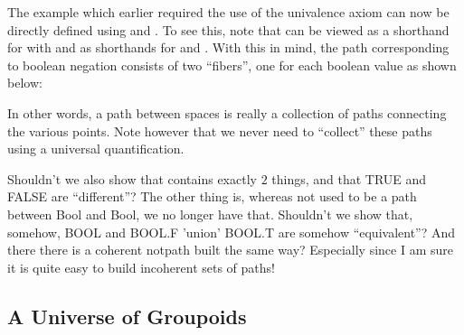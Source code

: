 The example  which earlier required the use of the
univalence axiom can now be directly defined using
 and . To
see this, note that  can be viewed as a shorthand for
 
 with  and
 as shorthands for
  and
 . With this in
mind, the path corresponding to boolean negation consists of two ``fibers'',
one for each boolean value as shown below:

\noindent In other words, a path between spaces is really a collection of
paths connecting the various points. Note however that we never need to
``collect'' these paths using a universal quantification.

Shouldn't we also show that  contains exactly
$2$ things, and that TRUE and FALSE are ``different''? The other thing
is, whereas not used to be a path between Bool and Bool, we no longer
have that.  Shouldn't we show that, somehow, BOOL and BOOL.F 'union'
BOOL.T are somehow ``equivalent''?  And there there is a coherent
notpath built the same way?  Especially since I am sure it is quite
easy to build incoherent sets of paths!

\subsection{A Universe of Groupoids} 







